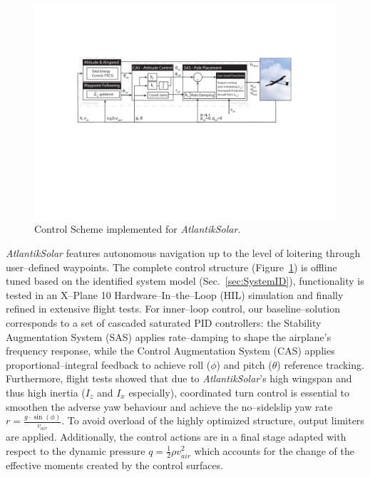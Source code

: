 \begin{figure}[tb]
    \centering
     \includegraphics[width=\linewidth]{images/11_ControlScheme/ControlScheme.pdf}
    \caption{Control Scheme implemented for \textit{AtlantikSolar}.}
    \label{fig:ControlScheme}
\end{figure}

\textit{AtlantikSolar} features autonomous navigation up to the level of loitering through user--defined waypoints. The complete control structure (Figure~\ref{fig:ControlScheme}) is offline tuned based on the identified system model (Sec.~\ref{sec:SystemID}), functionality is tested in an X--Plane 10 Hardware--In--the--Loop (HIL) simulation and finally refined in extensive flight tests. For inner--loop control, our baseline--solution corresponds to a set of cascaded saturated PID controllers: the Stability Augmentation System (SAS) applies rate--damping to shape the airplane's frequency response, while the Control Augmentation System (CAS) applies proportional--integral feedback to achieve roll ($\phi$) and pitch ($\theta$) reference tracking. Furthermore, flight tests showed that due to \textit{AtlantikSolar}'s high wingspan and thus high inertia ($I_z$ and $I_x$ especially), coordinated turn control is essential to smoothen the adverse yaw behaviour and achieve the no--sidelslip yaw rate $r=\frac{g\cdot \sin(\phi)}{v_{air}}$. To avoid overload of the highly optimized structure, output limiters are applied. Additionally, the control actions are in a final stage adapted with respect to the dynamic pressure $q=\frac{1}{2}\rho v^{2}_{air}$ which accounts for the change of the effective moments created by the control surfaces. 

